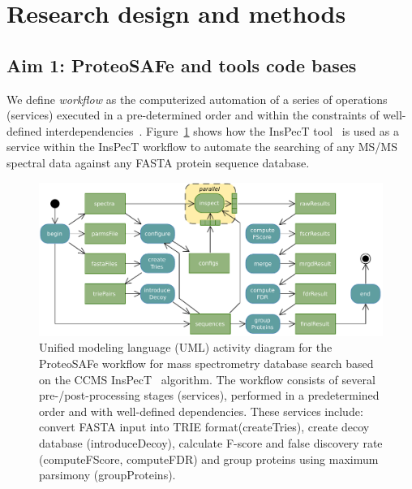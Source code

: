 \documentclass[arial,11pt]{article}
\newcommand{\SF}[1]{\textsf{#1}}
\newcommand{\SYSTEM}[0]{\SF{ProteoSAFe}\xspace}
\begin{document}
\section{Research design and methods}

\subsection{Aim 1: ProteoSAFe and tools code bases}


We define {\em workflow} as the computerized automation of a series of operations (services) executed in a pre-determined order and within the constraints of well-defined interdependencies~\cite{wfms:1995,wfms:1999}. Figure~\ref{fig:ex-workflow} shows how the InsPecT tool~\cite{Tanner:2005} is used as a service within the InsPecT workflow to automate the searching of any MS/MS spectral data against any FASTA protein sequence database.

\begin{figure}[ht!]
  \centering
  \includegraphics[width=16cm]{figures/inspect.pdf}
  \caption{\footnotesize Unified modeling language (UML) activity diagram for the \SYSTEM workflow for mass spectrometry database search based on the CCMS InsPecT~\cite{Tanner:2005} algorithm.  The workflow consists of several pre-/post-processing stages (services), performed in a predetermined order and with well-defined dependencies. These services include: convert FASTA input into TRIE format(\SF{createTries}), create decoy database (\SF{introduceDecoy}), calculate F-score and false discovery rate (\SF{computeFScore}, \SF{computeFDR}) and group proteins using maximum parsimony (\SF{groupProteins}).}
  \label{fig:ex-workflow}
\end{figure}
\end{document}
